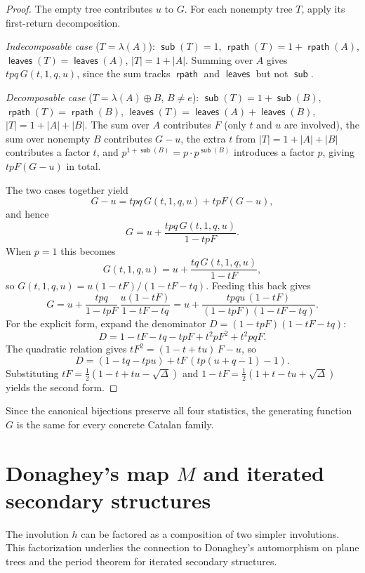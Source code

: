 \documentclass[a4paper,11pt]{article}
\theoremstyle{definition}
\DeclareMathOperator{\rpath}{\mathsf{rpath}}
\DeclareMathOperator{\leaves}{\mathsf{leaves}}
\DeclareMathOperator{\subtrees}{\mathsf{sub}}
\begin{document}
\begin{proof}
The empty tree contributes $u$ to $G$. For each
nonempty tree $T$, apply its first-return decomposition.

\emph{Indecomposable case} ($T = \lambda(A)$):
$\subtrees(T) = 1$,
$\rpath(T) = 1 + \rpath(A)$,
$\leaves(T) = \leaves(A)$, $|T| = 1 + |A|$.
Summing over $A$ gives $tpq\, G(t,1,q,u)$, since the
sum tracks $\rpath$ and $\leaves$ but not $\subtrees$.

\emph{Decomposable case}
($T = \lambda(A) \oplus B$, $B \neq e$):
$\subtrees(T) = 1 + \subtrees(B)$,
$\rpath(T) = \rpath(B)$,
$\leaves(T) = \leaves(A) + \leaves(B)$,
$|T| = 1 + |A| + |B|$.
The sum over $A$ contributes $F$ (only $t$ and $u$
are involved), the sum over nonempty $B$ contributes
$G - u$, the extra $t$ from $|T| = 1 + |A| + |B|$
contributes a factor $t$, and
$p^{1 + \subtrees(B)} = p \cdot p^{\subtrees(B)}$
introduces a factor $p$, giving $tpF(G - u)$ in total.

The two cases together yield
\[
  G - u = tpq\, G(t,1,q,u) + tpF(G - u),
\]
and hence
\[
  G = u + \frac{tpq\, G(t,1,q,u)}{1 - tpF}.
\]
When $p = 1$ this becomes
\[
  G(t,1,q,u) = u +
    \frac{tq\, G(t,1,q,u)}{1 - tF},
\]
so $G(t,1,q,u) = u(1 - tF)/(1 - tF - tq)$.
Feeding this back gives
\[
  G
  =  u + \frac{tpq}{1 - tpF}\,
    \frac{u(1 - tF)}{1 - tF - tq}
  = u + \frac{tpqu\,(1 - tF)}
    {(1 - tpF)(1 - tF - tq)}.
\]
For the explicit form, expand the denominator
$D = (1 - tpF)(1 - tF - tq)$:
\[
  D = 1 - tF - tq - tpF + t^2 pF^2 + t^2 pqF.
\]
The quadratic relation gives
$tF^2 = (1 - t + tu)\,F - u$, so
\[
  D = (1 - tq - tpu) + tF\,(tp(u + q - 1) - 1).
\]
Substituting
$tF = \tfrac{1}{2}(1 - t + tu - \sqrt{\Delta})$ and
$1 - tF = \tfrac{1}{2}(1 + t - tu + \sqrt{\Delta})$
yields the second form.
\end{proof}

Since the canonical bijections preserve all four
statistics, the generating function $G$ is the same for
every concrete Catalan family.

\section{Donaghey's map $M$ and iterated secondary
  structures}\label{sec:donaghey-section}

The involution $h$ can be factored as a composition of two simpler
involutions. This factorization underlies the connection to Donaghey's
automorphism on plane trees and the period theorem for iterated secondary
structures.
\end{document}
